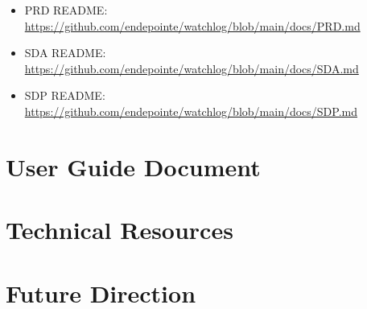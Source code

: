 \documentclass{article}
\begin{document}
\begin{itemize}
    \item PRD README: \url{https://github.com/endepointe/watchlog/blob/main/docs/PRD.md}
    \item SDA README: \url{https://github.com/endepointe/watchlog/blob/main/docs/SDA.md}
    \item SDP README: \url{https://github.com/endepointe/watchlog/blob/main/docs/SDP.md}
\end{itemize}

\newpage

\section{User Guide Document}

\newpage

\section{Technical Resources}

\newpage

\section{Future Direction}
\end{document}
